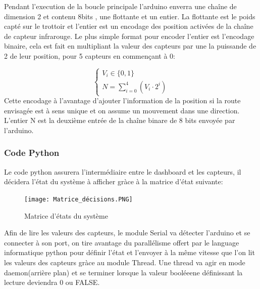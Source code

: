 \documentclass[journal]{IEEEtran}
\begin{document}
Pendant l'execution de la boucle principale l'arduino enverra une chaîne de dimension 2 et contenu 8bits , une flottante et un entier. La flottante est le poids capté sur le trottoir et l'entier est un encodage des position
activées de la chaîne de capteur infrarouge. Le plus simple format pour encoder l'entier est l'encodage binaire, cela est fait en multipliant la valeur des capteurs par une la puissande de 2 de leur position, pour 
5 capteurs en commençant à 0:

\begin{equation}\label{eq-1}
    \left\{\begin{aligned}
        V_i \in \{0,1\} \\
        N = \sum_{i=0}^{4}(V_i\cdot 2^i)
    \end{aligned} \right. 
\end{equation}
Cette encodage à l'avantage d'ajouter l'information de la position si la route envisagée est à sens unique et on assume un mouvement dans une direction. L'entier N est la deuxième entrée de la chaîne binare de 
8 bits envoyée par l'arduino.

\subsubsection{Code Python}
Le code python assurera l'intermédiaire entre le dashboard et les capteurs, il décidera l'état du système à afficher gràce à la matrice  d'état suivante:
\begin{figure}[htbp]
    \centerline{\texttt{[image: Matrice\_décisions.PNG]}}
    \caption{Matrice d'états du système}
    \label{fig4}
\end{figure} 

Afin de lire les valeurs des capteurs, le module Serial va détecter l'arduino et se connecter à son port, on tire avantage du parallélisme offert par le language informatique python pour 
définir l'état et l'envoyer à la même vitesse que l'on lit les valeurs des capteurs gràce au module Thread. Une thread va agir en mode daemon(arrière plan) et se terminer lorsque la valeur booléeene définissant
la lecture deviendra 0 ou FALSE.
\end{document}
